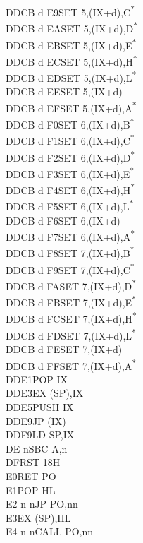 \documentclass[twoside,openright,a4paper]{book}
\begin{document}
\begin{multicols}{3}
{\begin{tabbing}
	DDCB d E9\>SET 5,(IX+d),C\textsuperscript{*}\\
	DDCB d EA\>SET 5,(IX+d),D\textsuperscript{*}\\
	DDCB d EB\>SET 5,(IX+d),E\textsuperscript{*}\\
	DDCB d EC\>SET 5,(IX+d),H\textsuperscript{*}\\
	DDCB d ED\>SET 5,(IX+d),L\textsuperscript{*}\\
	DDCB d EE\>SET 5,(IX+d)\\
	DDCB d EF\>SET 5,(IX+d),A\textsuperscript{*}\\
	DDCB d F0\>SET 6,(IX+d),B\textsuperscript{*}\\
	DDCB d F1\>SET 6,(IX+d),C\textsuperscript{*}\\
	DDCB d F2\>SET 6,(IX+d),D\textsuperscript{*}\\
	DDCB d F3\>SET 6,(IX+d),E\textsuperscript{*}\\
	DDCB d F4\>SET 6,(IX+d),H\textsuperscript{*}\\
	DDCB d F5\>SET 6,(IX+d),L\textsuperscript{*}\\
	DDCB d F6\>SET 6,(IX+d)\\
	DDCB d F7\>SET 6,(IX+d),A\textsuperscript{*}\\
	DDCB d F8\>SET 7,(IX+d),B\textsuperscript{*}\\
	DDCB d F9\>SET 7,(IX+d),C\textsuperscript{*}\\
	DDCB d FA\>SET 7,(IX+d),D\textsuperscript{*}\\
	DDCB d FB\>SET 7,(IX+d),E\textsuperscript{*}\\
	DDCB d FC\>SET 7,(IX+d),H\textsuperscript{*}\\
	DDCB d FD\>SET 7,(IX+d),L\textsuperscript{*}\\
	DDCB d FE\>SET 7,(IX+d)\\
	DDCB d FF\>SET 7,(IX+d),A\textsuperscript{*}\\
	DDE1\>POP IX\\
	DDE3\>EX (SP),IX\\
	DDE5\>PUSH IX\\
	DDE9\>JP (IX)\\
	DDF9\>LD SP,IX\\
	DE n\>SBC A,n\\
	DF\>RST 18H\\
	E0\>RET PO\\
	E1\>POP HL\\
	E2 n n\>JP PO,nn\\
	E3\>EX (SP),HL\\
	E4 n n\>CALL PO,nn\\

\end{tabbing}}
\end{multicols}
\end{document}
